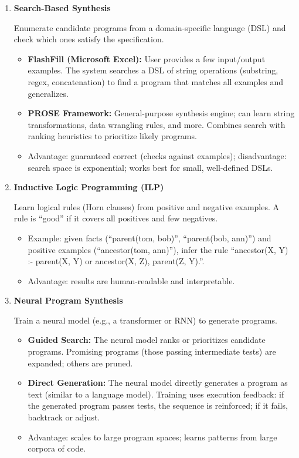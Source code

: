 \begin{enumerate}
    \item \textbf{Search-Based Synthesis}

    Enumerate candidate programs from a domain-specific language (DSL) and check which ones satisfy the specification.
    \begin{itemize}
        \item \textbf{FlashFill (Microsoft Excel):} User provides a few input/output examples. The system searches a DSL of string operations (substring, regex, concatenation) to find a program that matches all examples and generalizes.
        \item \textbf{PROSE Framework:} General-purpose synthesis engine; can learn string transformations, data wrangling rules, and more. Combines search with ranking heuristics to prioritize likely programs.
        \item Advantage: guaranteed correct (checks against examples); disadvantage: search space is exponential; works best for small, well-defined DSLs.
    \end{itemize}

    \item \textbf{Inductive Logic Programming (ILP)}

    Learn logical rules (Horn clauses) from positive and negative examples. A rule is ``good'' if it covers all positives and few negatives.
    \begin{itemize}
        \item Example: given facts (``parent(tom, bob)'', ``parent(bob, ann)'') and positive examples (``ancestor(tom, ann)''), infer the rule ``ancestor(X, Y) :- parent(X, Y) or ancestor(X, Z), parent(Z, Y).''.
        \item Advantage: results are human-readable and interpretable.
    \end{itemize}

    \item \textbf{Neural Program Synthesis}

    Train a neural model (e.g., a transformer or RNN) to generate programs.
    \begin{itemize}
        \item \textbf{Guided Search:} The neural model ranks or prioritizes candidate programs. Promising programs (those passing intermediate tests) are expanded; others are pruned.
        \item \textbf{Direct Generation:} The neural model directly generates a program as text (similar to a language model). Training uses execution feedback: if the generated program passes tests, the sequence is reinforced; if it fails, backtrack or adjust.
        \item Advantage: scales to large program spaces; learns patterns from large corpora of code.
    \end{itemize}


\end{enumerate}
